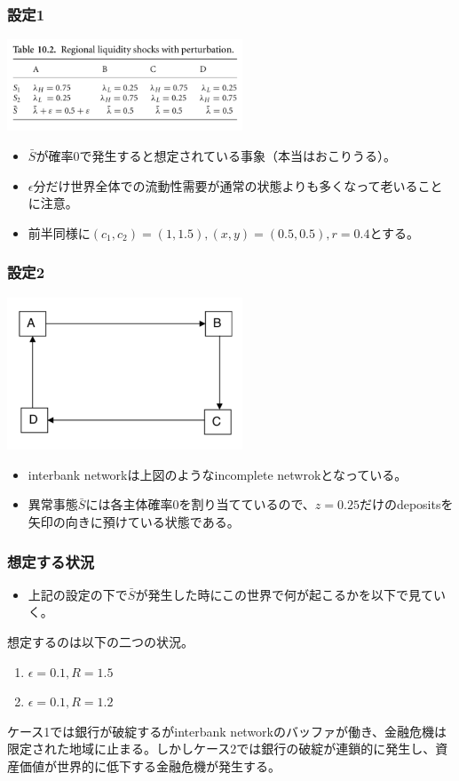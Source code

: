 \documentclass[dvipdfmx, 12pt]{beamer}
\begin{document}
\begin{frame}\frametitle{設定1}
	\includegraphics[width = 7cm]{10-2.png}
	
	\begin{itemize}
	\item $\bar{S}$が確率0で発生すると想定されている事象（本当はおこりうる）。
	\item $\epsilon$分だけ世界全体での流動性需要が通常の状態よりも多くなって老いることに注意。
	\item 前半同様に$(c_1, c_2) = (1, 1.5), (x,y) = (0.5, 0.5), r = 0.4$とする。
	\end{itemize}
\end{frame}

\begin{frame}\frametitle{設定2}
	\includegraphics[width = 7cm]{10-5.png}
	\begin{itemize}
	\item interbank networkは上図のようなincomplete netwrokとなっている。
	\item 異常事態$\bar{S}$には各主体確率0を割り当てているので、$z = 0.25$だけのdepositsを矢印の向きに預けている状態である。
	\end{itemize}
\end{frame}

\begin{frame}\frametitle{想定する状況}
	\begin{itemize}
	\item 上記の設定の下で$\bar{S}$が発生した時にこの世界で何が起こるかを以下で見ていく。
	\end{itemize}
	想定するのは以下の二つの状況。
	\begin{enumerate}
	\item $\epsilon = 0.1, R = 1.5$
	\item $\epsilon = 0.1, R = 1.2$
	\end{enumerate}
	ケース1では銀行が破綻するがinterbank networkのバッファが働き、金融危機は限定された地域に止まる。しかしケース2では銀行の破綻が連鎖的に発生し、資産価値が世界的に低下する金融危機が発生する。
\end{frame}
\end{document}

